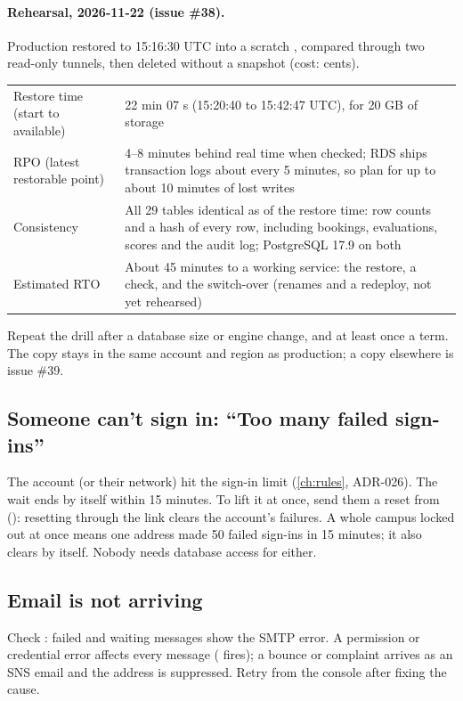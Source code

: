 \paragraph{Rehearsal, 2026-11-22 (issue \#38).} Production restored to 15:16:30 UTC into a
scratch , compared through two read-only tunnels, then deleted without a
snapshot (cost: cents).
{\tablefont
\begin{xltabular}{\linewidth}{@{}P{38mm} L@{}}
  \toprule
   & \\
  \midrule
  Restore time (start to available) & 22 min 07 s (15:20:40 to 15:42:47 UTC), for 20 GB of storage\\
  RPO (latest restorable point) & 4--8 minutes behind real time when checked; RDS ships transaction logs about every 5 minutes, so plan for up to about 10 minutes of lost writes\\
  Consistency & All 29 tables identical as of the restore time: row counts and a hash of every row, including bookings, evaluations, scores and the audit log; PostgreSQL 17.9 on both\\
  Estimated RTO & About 45 minutes to a working service: the restore, a check, and the switch-over (renames and a redeploy, not yet rehearsed)\\
  \bottomrule
\end{xltabular}}
Repeat the drill after a database size or engine change, and at least once a term. The copy stays
in the same account and region as production; a copy elsewhere is issue \#39.

\subsection{Someone can't sign in: ``Too many failed sign-ins''}
The account (or their network) hit the sign-in limit (\cref{ch:rules}, ADR-026). The wait ends by
itself within 15 minutes. To lift it at once, send them a reset from 
(): resetting through the link clears the account's failures. A whole
campus locked out at once means one address made 50 failed sign-ins in 15 minutes; it also
clears by itself. Nobody needs database access for either.

\subsection{Email is not arriving}
Check : failed and waiting messages show the SMTP error. A permission or
credential error affects every message ( fires); a bounce or
complaint arrives as an SNS email and the address is suppressed. Retry from the console after
fixing the cause.

